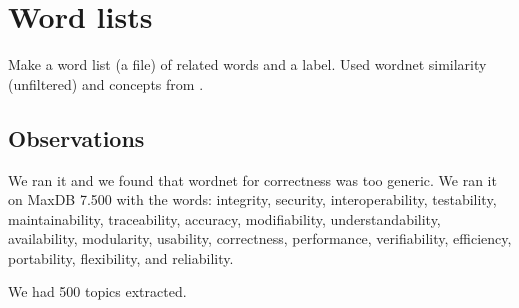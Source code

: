 \documentclass{article}
\begin{document}
\section{Word lists}

Make a word list (a file) of related words and a label. Used wordnet
similarity (unfiltered) and concepts from \cite{5072519}.

\subsection{Observations}

We ran it and we found that wordnet for correctness was too
generic. We ran it on MaxDB 7.500 with the words: integrity, security,
interoperability, testability, maintainability, traceability,
accuracy, modifiability, understandability, availability, modularity,
usability, correctness, performance, verifiability, efficiency,
portability, flexibility, and reliability.

We had 500 topics extracted.
\end{document}
